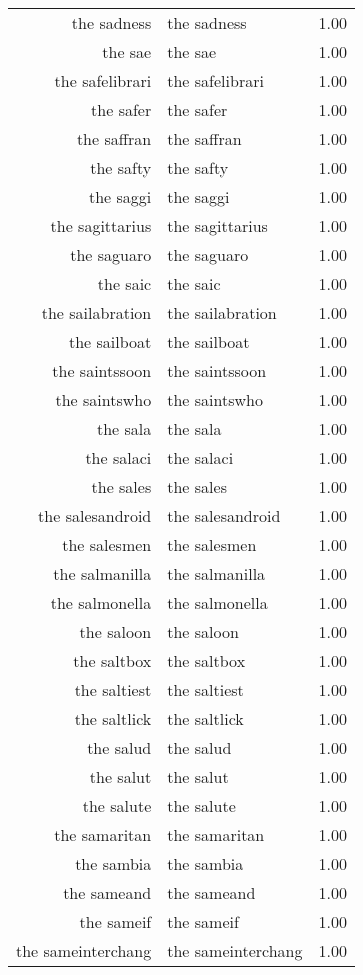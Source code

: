 \begin{table}[ht]
\begin{tabular}{rlr}
  the sadness & the sadness & 1.00 \\ 
  the sae & the sae & 1.00 \\ 
  the safelibrari & the safelibrari & 1.00 \\ 
  the safer & the safer & 1.00 \\ 
  the saffran & the saffran & 1.00 \\ 
  the safty & the safty & 1.00 \\ 
  the saggi & the saggi & 1.00 \\ 
  the sagittarius & the sagittarius & 1.00 \\ 
  the saguaro & the saguaro & 1.00 \\ 
  the saic & the saic & 1.00 \\ 
  the sailabration & the sailabration & 1.00 \\ 
  the sailboat & the sailboat & 1.00 \\ 
  the saintssoon & the saintssoon & 1.00 \\ 
  the saintswho & the saintswho & 1.00 \\ 
  the sala & the sala & 1.00 \\ 
  the salaci & the salaci & 1.00 \\ 
  the sales & the sales & 1.00 \\ 
  the salesandroid & the salesandroid & 1.00 \\ 
  the salesmen & the salesmen & 1.00 \\ 
  the salmanilla & the salmanilla & 1.00 \\ 
  the salmonella & the salmonella & 1.00 \\ 
  the saloon & the saloon & 1.00 \\ 
  the saltbox & the saltbox & 1.00 \\ 
  the saltiest & the saltiest & 1.00 \\ 
  the saltlick & the saltlick & 1.00 \\ 
  the salud & the salud & 1.00 \\ 
  the salut & the salut & 1.00 \\ 
  the salute & the salute & 1.00 \\ 
  the samaritan & the samaritan & 1.00 \\ 
  the sambia & the sambia & 1.00 \\ 
  the sameand & the sameand & 1.00 \\ 
  the sameif & the sameif & 1.00 \\ 
  the sameinterchang & the sameinterchang & 1.00 \\ 

\end{tabular}
\end{table}
